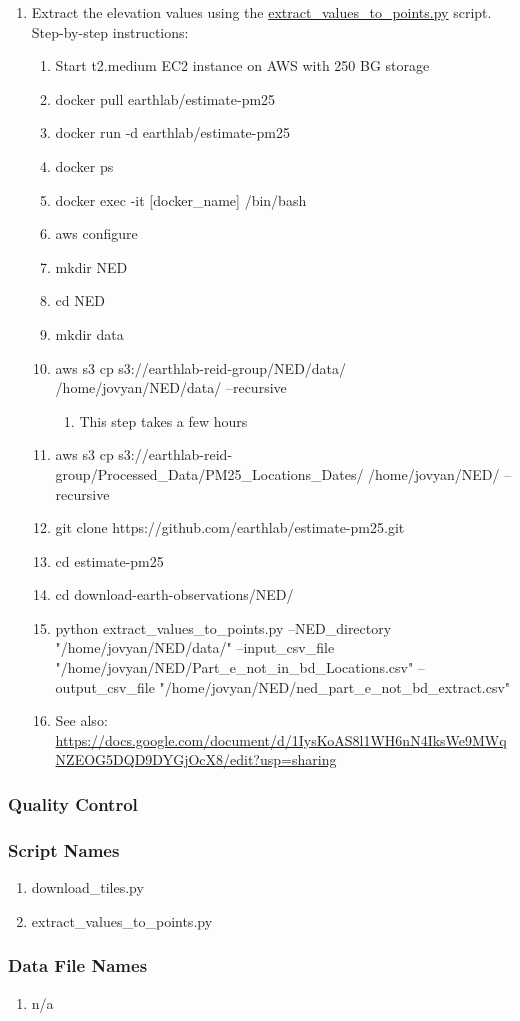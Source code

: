 \begin{enumerate}
\item Extract the elevation values using the \href{https://github.com/earthlab/estimate-pm25/blob/master/download-earth-observations/NED/extract_values_to_points.py}{extract\_values\_to\_points.py} script. Step-by-step instructions:
	\begin{enumerate}
	\item Start t2.medium EC2 instance on AWS with 250 BG storage
	\item docker pull earthlab/estimate-pm25
	\item docker run -d earthlab/estimate-pm25
	\item docker ps
	\item docker exec -it [docker\_name] /bin/bash
	\item aws configure
	\item mkdir NED
	\item cd NED
	\item mkdir data 
	\item aws s3 cp s3://earthlab-reid-group/NED/data/ /home/jovyan/NED/data/ --recursive 
		\begin{enumerate}
		\item This step takes a few hours
		\end{enumerate}
	\item aws s3 cp s3://earthlab-reid-group/Processed\_Data/PM25\_Locations\_Dates/ /home/jovyan/NED/ --recursive
	\item git clone https://github.com/earthlab/estimate-pm25.git
	\item cd estimate-pm25
	\item cd download-earth-observations/NED/
	\item python extract\_values\_to\_points.py --NED\_directory "/home/jovyan/NED/data/" --input\_csv\_file "/home/jovyan/NED/Part\_e\_not\_in\_bd\_Locations.csv" --output\_csv\_file "/home/jovyan/NED/ned\_part\_e\_not\_bd\_extract.csv"
	\item See also: \url{https://docs.google.com/document/d/1IysKoAS8l1WH6nN4IksWe9MWqNZEOG5DQD9DYGjOcX8/edit?usp=sharing}
	\end{enumerate}




\end{enumerate}
\subsubsection*{Quality Control}
\subsubsection*{Script Names}
\begin{enumerate}
\item download\_tiles.py
\item extract\_values\_to\_points.py
\end{enumerate}
\subsubsection*{Data File Names}
\begin{enumerate}
\item n/a
\end{enumerate}